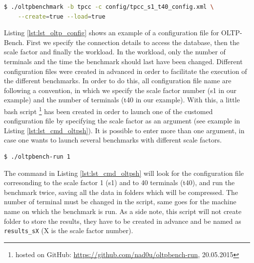 {
\singlespacing
\begin{lstlisting}[frame=single,language=bash,caption={oltp create},label={lst:lst_cmd_oltpbenchmark}]
  $ ./oltpbenchmark -b tpcc -c config/tpcc_s1_t40_config.xml \
    --create=true --load=true
\end{lstlisting}
}

Listing \ref{lst:lst_oltp_config} shows an example of a configuration file for OLTP-Bench. 
First we specify the connection details to access the database, then the scale factor and finally the workload. 
In the workload, only the number of terminals and the time the benchmark should last have been changed. 
Different configuration files were created in advanced in order to facilitate the execution of the different benchmarks. 
In order to do this, all configuration file name are following a convention, in which we specify the scale factor number (s1 in our example) and the number of terminals (t40 in our example).
With this, a little bash script \footnote{hosted on GitHub: \url{https://github.com/nad0u/oltpbench-run}, 20.05.2015}
has been created in order to launch one of the customed configuration file by specifying the scale factor as an argument (see example in Listing \ref{lst:lst_cmd_oltpsh}).
It is possible to enter more than one argument, in case one wants to launch several benchmarks with different scale factors.

{
\singlespacing
\begin{lstlisting}[frame=single,language=bash,caption={Bash script for launching benchmarks},label={lst:lst_cmd_oltpsh}]
  $ ./oltpbench-run 1
\end{lstlisting}
}

The command in Listing \ref{lst:lst_cmd_oltpsh} will look for the configuration file corresonding to the scale factor 1 (s1) and to 40 terminals (t40), and run the benchmark twice, saving all the data in folders which will be compressed.
The number of terminal must be changed in the script, same goes for the machine name on which the benchmark is run.
As a side note, this script will not create folder to store the results, they have to be created in advance and be named as \texttt{results\_sX} (X is the scale factor number).

{
\singlespacing
{}
    
}







